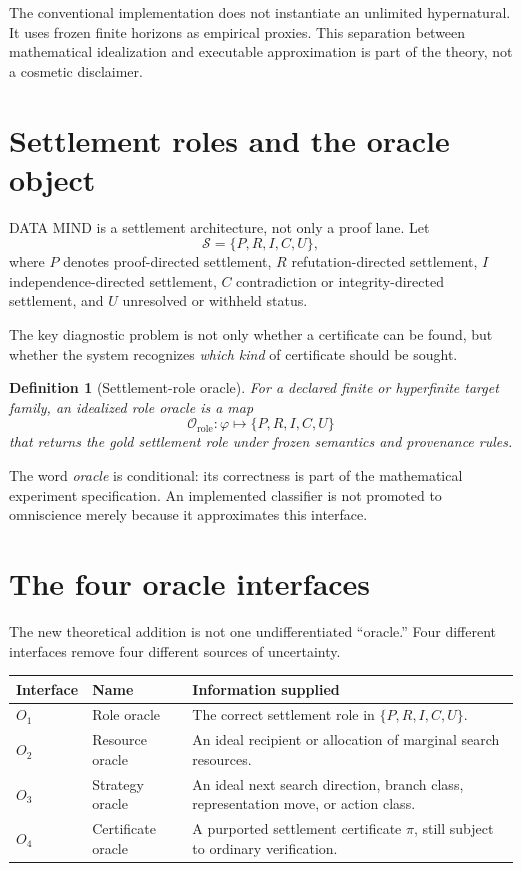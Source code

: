 \documentclass[11pt]{article}
\newtheorem{definition}{Definition}[section]
\newcommand{\Oracle}{\mathscr O}
\begin{document}
The conventional implementation does not instantiate an unlimited hypernatural. It uses frozen finite horizons as empirical proxies. This separation between mathematical idealization and executable approximation is part of the theory, not a cosmetic disclaimer.

\section{Settlement roles and the oracle object}

DATA MIND is a settlement architecture, not only a proof lane. Let
\begin{equation}
\mathcal S=\{P,R,I,C,U\},
\end{equation}
where $P$ denotes proof-directed settlement, $R$ refutation-directed settlement, $I$ independence-directed settlement, $C$ contradiction or integrity-directed settlement, and $U$ unresolved or withheld status.

The key diagnostic problem is not only whether a certificate can be found, but whether the system recognizes \emph{which kind} of certificate should be sought.

\begin{definition}[Settlement-role oracle]
For a declared finite or hyperfinite target family, an idealized role oracle is a map
\begin{equation}
\Oracle_{\mathrm{role}}:\varphi\longmapsto \{P,R,I,C,U\}
\end{equation}
that returns the gold settlement role under frozen semantics and provenance rules.
\end{definition}

The word \emph{oracle} is conditional: its correctness is part of the mathematical experiment specification. An implemented classifier is not promoted to omniscience merely because it approximates this interface.

\section{The four oracle interfaces}

The new theoretical addition is not one undifferentiated ``oracle.'' Four different interfaces remove four different sources of uncertainty.

\begin{center}
\begin{tabular}{p{}p{}p{}}
\toprule
Interface & Name & Information supplied \\
\midrule
$O_1$ & Role oracle & The correct settlement role in $\{P,R,I,C,U\}$. \\
$O_2$ & Resource oracle & An ideal recipient or allocation of marginal search resources. \\
$O_3$ & Strategy oracle & An ideal next search direction, branch class, representation move, or action class. \\
$O_4$ & Certificate oracle & A purported settlement certificate $\pi$, still subject to ordinary verification. \\
\bottomrule
\end{tabular}
\end{center}
\end{document}
